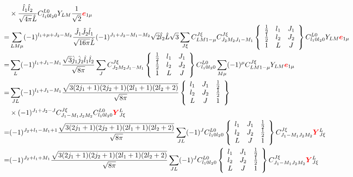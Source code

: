 \documentclass[a4paper]{article}
\newcommand{\no}{\nonumber}
\newcommand{\bmm}[1]{{\color{red}\bm{#1}}}
\begin{document}
\begin{align}
\no&\times\frac{\hat{l}_{1}\hat{l}_{2}}{\sqrt{4\pi}\hat{L}}C_{l_{1}0l_{2}0}^{L0}Y_{LM}\frac{1}{\sqrt{2}}\bmm{e}_{1\mu}\\
\no=&\sum_{LM\mu}(-1)^{l_{1}+\mu+J_{2}-M_{2}}\frac{\hat{J}_{1}\hat{J}_{2}\hat{l}_{1}}{\sqrt{16\pi}\hat{L}}(-1)^{J_{1}+J_{2}-M_{1}-M_{2}}\sqrt{2}\hat{l}_{2}\hat{L}\sqrt{3}\sum_{J\xi}C_{LM1-\mu}^{J\xi}C_{J_{2}M_{2}J_{1}-M_{1}}^{J\xi}\left\{\begin{array}{ccc}\frac{1}{2}&l_{1}&J_{1}\\ \frac{1}{2}&l_{2}&J_{2}\\1&L&J\end{array}\right\}C_{l_{1}0l_{2}0}^{L0}Y_{LM}\bmm{e}_{1\mu}\\
\no=&\sum_{L}(-1)^{l_{1}+J_{1}-M_{1}}\frac{\sqrt{3}\hat{j}_{1}\hat{j}_{2}\hat{l}_{1}\hat{l}_{2}}{\sqrt{8\pi}}\sum_{J}C_{J_{2}M_{2}J_{1}-M_{1}}^{J\xi}\left\{\begin{array}{ccc}\frac{1}{2}&l_{1}&J_{1}\\ \frac{1}{2}&l_{2}&J_{2}\\ 1&L&J\end{array}\right\}C_{l_{1}0l_{2}0}^{L0}\sum_{M\mu}(-1)^{\mu}C_{LM1-\mu}^{J\xi}Y_{LM}\bmm{e}_{1\mu}\\
\no=&\sum_{JL}(-1)^{l_{1}+J_{1}-M_{1}}\frac{\sqrt{3(2j_{1}+1)(2j_{2}+1)(2l_{1}+1)(2l_{2}+2)}}{\sqrt{8\pi}}\left\{\begin{array}{ccc}l_{1}&J_{1}&\frac{1}{2}\\l_{2}&J_{2}&\frac{1}{2}\\L&J&1\end{array}\right\}\\
\no&\times (-1)^{J_{1}+J_{2}-J}C_{J_{1}-M_{1}J_{2}M_{2}}^{J\xi}C_{l_{1}0l_{2}0}^{L0}\bmm{Y}_{J\xi}^{L}\\
\no=&(-1)^{J_{2}+l_{1}-M_{1}+1}\frac{\sqrt{3(2j_{1}+1)(2j_{2}+1)(2l_{1}+1)(2l_{2}+2)}}{\sqrt{8\pi}}\sum_{JL}(-1)^{J}C _{l_{1}0l_{2}0}^{L0}\left\{\begin{array}{ccc}l_{1}&J_{1}&\frac{1}{2}\\l_{2}&J_{2}&\frac{1}{2}\\L&J&1\end{array}\right\}C_{J_{1}-M_{1}J_{2}M_{2}}^{J\xi}\bmm{Y}_{J\xi}^{L}\\
=&(-1)^{J_{2}+l_{1}+M_{1}}\frac{\sqrt{3(2j_{1}+1)(2j_{2}+1)(2l_{1}+1)(2l_{2}+2)}}{\sqrt{8\pi}}\sum_{JL}(-1)^{J}C _{l_{1}0l_{2}0}^{L0}\left\{\begin{array}{ccc}l_{1}&J_{1}&\frac{1}{2}\\l_{2}&J_{2}&\frac{1}{2}\\L&J&1\end{array}\right\}C_{J_{1}-M_{1}J_{2}M_{2}}^{J\xi}\bmm{Y}_{J\xi}^{L}
\end{align}
\end{document}
